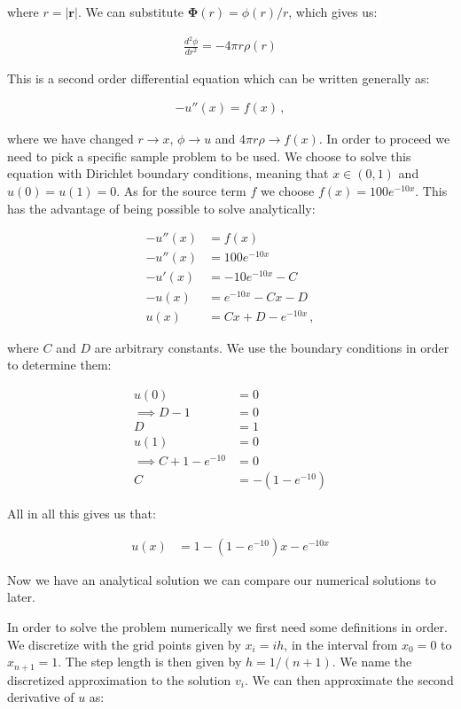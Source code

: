 \documentclass[english,notitlepage,reprint,nofootinbib]{revtex4-1}  %
\begin{document}
where $r = |\boldsymbol r|$. We can substitute $\boldsymbol \Phi (r) = \phi(r)/r$, which gives us:

\begin{align*}
\frac{d^2 \phi}{dr^2} = - 4\pi r \rho (r)
\end{align*}

This is a second order differential equation which can be written generally as:

\begin{align*}
-u''(x) = f(x) \, ,
\end{align*}

where we have changed $r \to x$, $\phi \to u$ and $4\pi r \rho \to f(x)$. In order to proceed we need to pick a specific sample problem to be used. We choose to solve this equation with Dirichlet boundary conditions, meaning that $x \in (0,1)$ and $u(0)=u(1)=0$. As for the source term $f$ we choose $f(x) = 100 e^{-10 x}$. This has the advantage of being possible to solve analytically:

\begin{align*}
-u''(x) &= f(x) \\
-u''(x) &= 100 e^{-10x} \\
-u'(x) &= -10e^{-10x} - C \\
-u(x) &= e^{-10x} - Cx - D \\
u(x) &= Cx + D - e^{-10x} \, ,
\end{align*}

where $C$ and $D$ are arbitrary constants. We use the boundary conditions in order to determine them:

\begin{align*}
u(0) &= 0 \\
\implies D - 1 &= 0 \\
D &= 1 \\
u(1) &= 0 \\
\implies C + 1 - e^{-10} &= 0 \\
C &= -(1 - e^{-10})
\end{align*}

All in all this gives us that:

\begin{align*}
u(x) &= 1 - (1 - e^{-10}) x - e^{-10x}
\end{align*}

Now we have an analytical solution we can compare our numerical solutions to later.

In order to solve the problem numerically we first need some definitions in order. We discretize with the grid points given by $x_i = ih$, in the interval from $x_0 = 0$ to $x_{n+1} = 1$. The step length is then given by $h = 1/(n+1)$. We name the discretized approximation to the solution $v_i$. We can then approximate the second derivative of $u$ as:
\end{document}
